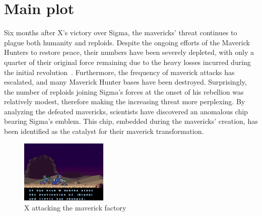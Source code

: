 \section{Main plot}
Six months after X's victory over Sigma, the mavericks' threat continues to plague both humanity and reploids. Despite the ongoing efforts of the Maverick Hunters to restore peace, their numbers have been severely depleted, with only a quarter of their original force remaining due to the heavy losses incurred during the initial revolution~\cite{Xcoll1:Manual_X2}. Furthermore, the frequency of maverick attacks has escalated, and many Maverick Hunter bases have been destroyed. Surprisingly, the number of reploids joining Sigma's forces at the onset of his rebellion was relatively modest, therefore making the increasing threat more perplexing. By analyzing the defeated mavericks, scientists have discovered an anomalous chip bearing Sigma's emblem. This chip, embedded during the mavericks' creation, has been identified as the catalyst for their maverick transformation.
\begin{figure}[htp]
	\centering
	\includegraphics[height=3cm]{figures/X2/story_1.jpg}
	\caption {X attacking the maverick factory}
\end{figure}


